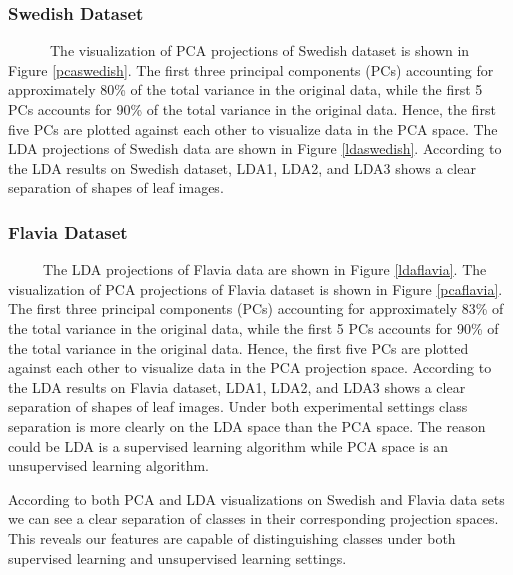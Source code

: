 \documentclass{article}
\begin{document}
\hypertarget{swedish-dataset}{%
\subsubsection{Swedish Dataset}\label{swedish-dataset}}

~~~~~~The visualization of PCA projections of Swedish dataset is shown
in Figure \ref{pcaswedish}. The first three principal components (PCs)
accounting for approximately 80\% of the total variance in the original
data, while the first 5 PCs accounts for 90\% of the total variance in
the original data. Hence, the first five PCs are plotted against each
other to visualize data in the PCA space. The LDA projections of Swedish
data are shown in Figure \ref{ldaswedish}. According to the LDA results
on Swedish dataset, LDA1, LDA2, and LDA3 shows a clear separation of
shapes of leaf images.

\hypertarget{flavia-dataset}{%
\subsubsection{Flavia Dataset}\label{flavia-dataset}}

~~~~~The LDA projections of Flavia data are shown in Figure
\ref{ldaflavia}. The visualization of PCA projections of Flavia dataset
is shown in Figure \ref{pcaflavia}. The first three principal components
(PCs) accounting for approximately 83\% of the total variance in the
original data, while the first 5 PCs accounts for 90\% of the total
variance in the original data. Hence, the first five PCs are plotted
against each other to visualize data in the PCA projection space.
According to the LDA results on Flavia dataset, LDA1, LDA2, and LDA3
shows a clear separation of shapes of leaf images. Under both
experimental settings class separation is more clearly on the LDA space
than the PCA space. The reason could be LDA is a supervised learning
algorithm while PCA space is an unsupervised learning algorithm.

According to both PCA and LDA visualizations on Swedish and Flavia data
sets we can see a clear separation of classes in their corresponding
projection spaces. This reveals our features are capable of
distinguishing classes under both supervised learning and unsupervised
learning settings.
\end{document}
